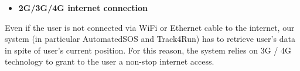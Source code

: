 \begin{itemize}
	\item \textbf{2G/3G/4G internet connection}
\end{itemize}
Even if the user is not connected via WiFi or Ethernet cable to the internet, our system (in particular AutomatedSOS and Track4Run) has to retrieve user's data in spite of user's current position. For this reason, the system relies on 3G / 4G technology to grant to the user a non-stop internet access.